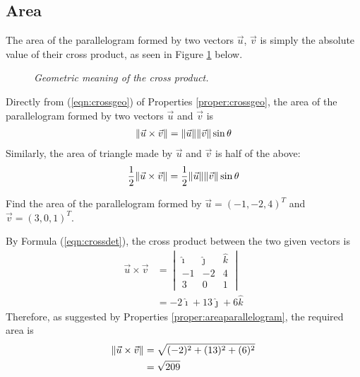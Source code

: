 \subsection{Area}
The area of the parallelogram formed by two vectors $\vec{u}$, $\vec{v}$ is simply the absolute value of their cross product, as seen in Figure \ref{fig:crossgeo} below.
\begin{figure}[h!]
    \centering
    \caption{\textit{Geometric meaning of the cross product.}}
    \label{fig:crossgeo}
\end{figure}
\begin{proper}
\label{proper:areaparallelogram}
Directly from (\ref{eqn:crossgeo}) of Properties \ref{proper:crossgeo}, the area of the parallelogram formed by two vectors $\vec{u}$ and $\vec{v}$ is
\begin{align}
\norm{\vec{u} \times \vec{v}} = \norm{\vec{u}}\norm{\vec{v}}\sin\theta
\end{align}
Similarly, the area of triangle made by $\vec{u}$ and $\vec{v}$ is half of the above:
\begin{align}
\frac{1}{2}\norm{\vec{u} \times \vec{v}} = \frac{1}{2}\norm{\vec{u}}\norm{\vec{v}}\sin\theta   
\end{align}
\end{proper}

\begin{exmp}
Find the area of the parallelogram formed by $\vec{u} = (-1, -2, 4)^T$ and $\vec{v} = (3, 0, 1)^T$.
\end{exmp}
\begin{solution}
By Formula (\ref{eqn:crossdet}), the cross product between the two given vectors is
\begin{align*}
\vec{u} \times \vec{v} &=
\begin{vmatrix}
\hat{\imath} & \hat{\jmath} & \hat{k} \\
-1 & -2 & 4 \\
3 & 0 & 1
\end{vmatrix} \\
&= -2\hat{\imath} + 13\hat{\jmath} + 6\hat{k}
\end{align*}
Therefore, as suggested by Properties \ref{proper:areaparallelogram}, the required area is
\begin{align*}
\norm{\vec{u} \times \vec{v}} &= \sqrt{(-2)^2 + (13)^2 + (6)^2} \\
&= \sqrt{209}
\end{align*}
\end{solution}

